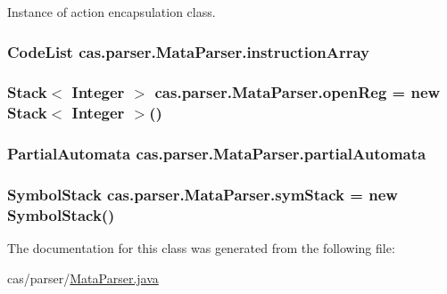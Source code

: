 Instance of action encapsulation class. \hypertarget{classcas_1_1parser_1_1_mata_parser_aebf4da5991406e740a80f21a1d44b54f}{
\subsubsection[{instruction\-Array}]{\setlength{\rightskip}{0pt plus 5cm}Code\-List cas.\-parser.\-Mata\-Parser.\-instruction\-Array}}\label{classcas_1_1parser_1_1_mata_parser_aebf4da5991406e740a80f21a1d44b54f}
\hypertarget{classcas_1_1parser_1_1_mata_parser_a6b4855da7611e701e380aea7477fb48a}{
\subsubsection[{open\-Reg}]{\setlength{\rightskip}{0pt plus 5cm}Stack$<$ Integer $>$ cas.\-parser.\-Mata\-Parser.\-open\-Reg = new Stack$<$ Integer $>$()}}\label{classcas_1_1parser_1_1_mata_parser_a6b4855da7611e701e380aea7477fb48a}
\hypertarget{classcas_1_1parser_1_1_mata_parser_af7dd1bb4dc646c7df148a5ea60731f2d}{
\subsubsection[{partial\-Automata}]{\setlength{\rightskip}{0pt plus 5cm}Partial\-Automata cas.\-parser.\-Mata\-Parser.\-partial\-Automata}}\label{classcas_1_1parser_1_1_mata_parser_af7dd1bb4dc646c7df148a5ea60731f2d}
\hypertarget{classcas_1_1parser_1_1_mata_parser_aba7f0d768253977ae41bdc34b9a35d22}{
\subsubsection[{sym\-Stack}]{\setlength{\rightskip}{0pt plus 5cm}Symbol\-Stack cas.\-parser.\-Mata\-Parser.\-sym\-Stack = new Symbol\-Stack()}}\label{classcas_1_1parser_1_1_mata_parser_aba7f0d768253977ae41bdc34b9a35d22}


The documentation for this class was generated from the following file\-:\begin{DoxyCompactItemize}
\item 
cas/parser/\hyperlink{_mata_parser_8java}{Mata\-Parser.\-java}\end{DoxyCompactItemize}
